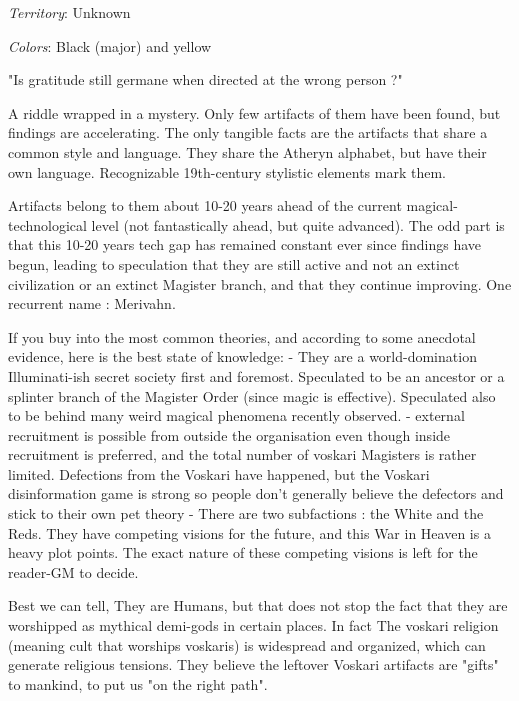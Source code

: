 \textit{Territory}: Unknown
    
\textit{Colors}: Black (major) and yellow


\begin{rpg-quotebox}
	"Is gratitude still germane when directed at the wrong person ?"
\end{rpg-quotebox}

A riddle wrapped in a mystery. Only few artifacts of them have been found, but findings are accelerating. The only tangible facts are the artifacts that share a common style and language. They share the Atheryn alphabet, but have their own language. Recognizable 19th-century stylistic elements mark them.

Artifacts belong to them about 10-20 years ahead of the current magical-technological level (not fantastically ahead, but quite advanced). The odd part is that this 10-20 years tech gap has remained constant ever since findings have begun, leading to speculation that they are still active and not an extinct civilization or an extinct Magister branch, and that they continue improving. One recurrent name : Merivahn.


If you buy into the most common theories, and according to some anecdotal evidence, here is the best state of knowledge: 
    - They are a world-domination Illuminati-ish secret society first and foremost. Speculated to be an ancestor or a splinter branch of the Magister Order (since magic is effective). Speculated also to be behind many weird magical phenomena recently observed.
    - external recruitment is possible from outside the organisation even though inside recruitment is preferred, and the total number of voskari Magisters is rather limited. Defections from the Voskari have happened, but the Voskari disinformation game is strong so people don't generally believe the defectors and stick to their own pet theory
    - There are two subfactions : the White and the Reds. They have competing visions for the future, and this War in Heaven is a heavy plot points. The exact nature of these competing visions is left for the reader-GM to decide.

Best we can tell, They are Humans, but that does not stop the fact that they are worshipped as mythical demi-gods in certain places. In fact The voskari religion (meaning cult that worships voskaris) is widespread and organized, which can generate religious tensions. They believe the leftover Voskari artifacts are "gifts" to mankind, to put us "on the right path". 


